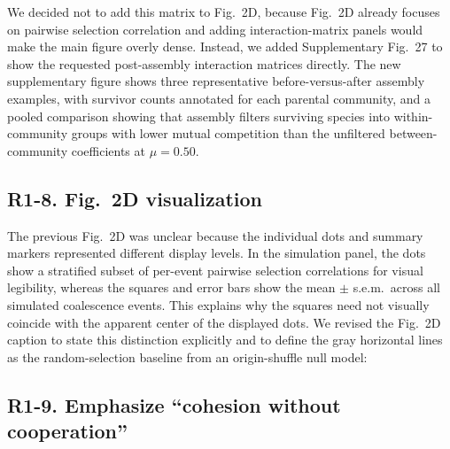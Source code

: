 \responselabel
We decided not to add this matrix to Fig.~2D, because Fig.~2D already focuses on pairwise selection correlation and adding interaction-matrix panels would make the main figure overly dense. Instead, we added Supplementary Fig.~27 to show the requested post-assembly interaction matrices directly. The new supplementary figure shows three representative before-versus-after assembly examples, with survivor counts annotated for each parental community, and a pooled comparison showing that assembly filters surviving species into within-community groups with lower mutual competition than the unfiltered between-community coefficients at $\mu = 0.50$.

\subsection*{R1-8. Fig.~2D visualization}


\responselabel
The previous Fig.~2D was unclear because the individual dots and summary markers represented different display levels. In the simulation panel, the dots show a stratified subset of per-event pairwise selection correlations for visual legibility, whereas the squares and error bars show the mean $\pm$ s.e.m.\ across all simulated coalescence events. This explains why the squares need not visually coincide with the apparent center of the displayed dots. We revised the Fig.~2D caption to state this distinction explicitly and to define the gray horizontal lines as the random-selection baseline from an origin-shuffle null model: 


\subsection*{R1-9. Emphasize ``cohesion without cooperation''}

